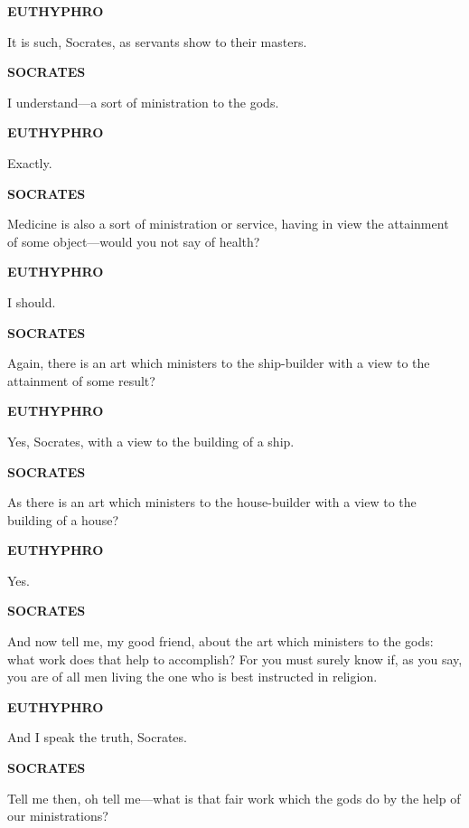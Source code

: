 \documentclass[11pt,letter]{article}
\begin{document}
\par \textbf{EUTHYPHRO}
\par   It is such, Socrates, as servants show to their masters.

\par \textbf{SOCRATES}
\par   I understand—a sort of ministration to the gods.

\par \textbf{EUTHYPHRO}
\par   Exactly.

\par \textbf{SOCRATES}
\par   Medicine is also a sort of ministration or service, having in view the attainment of some object—would you not say of health?

\par \textbf{EUTHYPHRO}
\par   I should.

\par \textbf{SOCRATES}
\par   Again, there is an art which ministers to the ship-builder with a view to the attainment of some result?

\par \textbf{EUTHYPHRO}
\par   Yes, Socrates, with a view to the building of a ship.

\par \textbf{SOCRATES}
\par   As there is an art which ministers to the house-builder with a view to the building of a house?

\par \textbf{EUTHYPHRO}
\par   Yes.

\par \textbf{SOCRATES}
\par   And now tell me, my good friend, about the art which ministers to the gods:  what work does that help to accomplish? For you must surely know if, as you say, you are of all men living the one who is best instructed in religion.

\par \textbf{EUTHYPHRO}
\par   And I speak the truth, Socrates.

\par \textbf{SOCRATES}
\par   Tell me then, oh tell me—what is that fair work which the gods do by the help of our ministrations?
\end{document}
